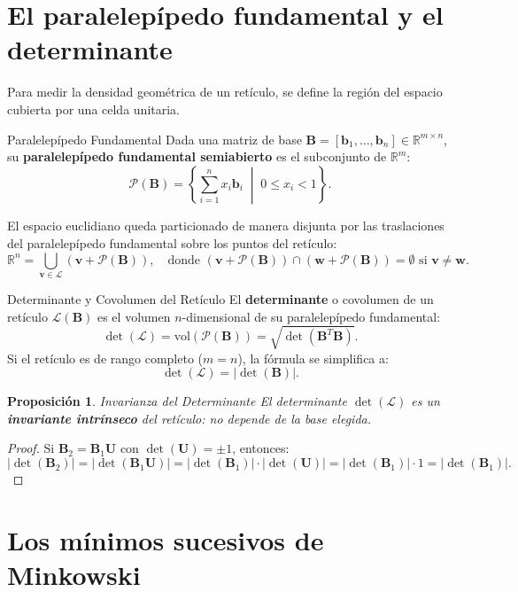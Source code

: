 \documentclass[11pt,a4paper,twoside,openright]{book}
\theoremstyle{plain}
\newtheorem{prop}[thm]{Proposici\'{o}n}
\theoremstyle{definition}
\theoremstyle{remark}
\newcommand{\R}{\mathbb{R}}
\newcommand{\vv}[1]{\mathbf{#1}}
\newcommand{\mm}[1]{\mathbf{#1}}
\begin{document}
\section{El paralelep\'ipedo fundamental y el determinante}

Para medir la densidad geom\'etrica de un ret\'iculo, se define la regi\'on del espacio cubierta por una celda unitaria.

\begin{midef}{Paralelep\'ipedo Fundamental}
Dada una matriz de base $\mm{B} = [\vv{b}_1, \ldots, \vv{b}_n] \in \R^{m \times n}$, su \textbf{paralelep\'ipedo fundamental semiabierto} es el subconjunto de $\R^m$:
\[
  \mathcal{P}(\mm{B}) = \left\{ \sum_{i=1}^n x_i \vv{b}_i \;\middle|\; 0 \leq x_i < 1 \right\}.
\]
\end{midef}

El espacio euclidiano queda particionado de manera disjunta por las traslaciones del paralelep\'ipedo fundamental sobre los puntos del ret\'iculo:
\[
  \R^n = \bigcup_{\vv{v} \in \mathcal{L}} (\vv{v} + \mathcal{P}(\mm{B})), \quad \text{donde } (\vv{v} + \mathcal{P}(\mm{B})) \cap (\vv{w} + \mathcal{P}(\mm{B})) = \emptyset \text{ si } \vv{v} \neq \vv{w}.
\]

\begin{midef}{Determinante y Covolumen del Ret\'iculo}
El \textbf{determinante} o covolumen de un ret\'iculo $\mathcal{L}(\mm{B})$ es el volumen $n$-dimensional de su paralelep\'ipedo fundamental:
\[
  \det(\mathcal{L}) = \mathrm{vol}(\mathcal{P}(\mm{B})) = \sqrt{\det(\mm{B}^T \mm{B})}.
\]
Si el ret\'iculo es de rango completo ($m = n$), la f\'ormula se simplifica a:
\[
  \det(\mathcal{L}) = |\det(\mm{B})|.
\]
\end{midef}

\begin{prop}{Invarianza del Determinante}
El determinante $\det(\mathcal{L})$ es un \textbf{invariante intr\'inseco} del ret\'iculo: no depende de la base elegida.
\end{prop}
\begin{proof}
Si $\mm{B}_2 = \mm{B}_1 \mm{U}$ con $\det(\mm{U}) = \pm 1$, entonces:
\[
  |\det(\mm{B}_2)| = |\det(\mm{B}_1 \mm{U})| = |\det(\mm{B}_1)| \cdot |\det(\mm{U})| = |\det(\mm{B}_1)| \cdot 1 = |\det(\mm{B}_1)|.
\]
\end{proof}

\section{Los m\'inimos sucesivos de Minkowski}
\end{document}
